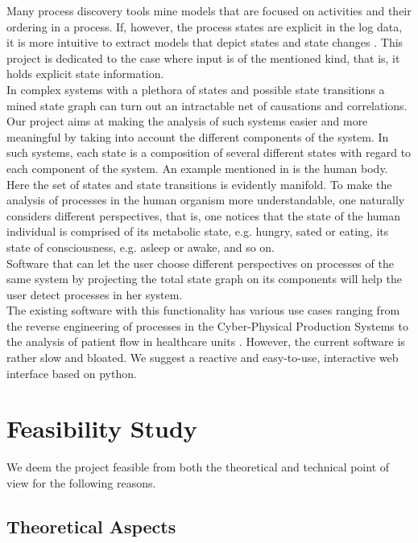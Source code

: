 \documentclass[12pt]{extarticle}
\begin{document}
Many process discovery tools mine models that are focused on activities and their ordering in a process. If, however, the process states are explicit in the log data, it is more intuitive to extract models that depict states and state changes \cite{csm-intro}. This project is dedicated to the case where input is of the mentioned kind, that is, it holds explicit state information.\\
In complex systems with a plethora of states and possible state transitions a mined state graph can turn out an intractable net of causations and correlations. Our project aims at making the analysis of such systems easier and more meaningful by taking into account the different components of the system. In such systems, each state is a composition of several different states with regard to each component of the system. An example mentioned in \cite{csm-intro} is the human body. Here the set of states and state transitions is evidently manifold. To make the analysis of processes in the human organism more understandable, one naturally considers different perspectives, that is, one notices that the state of the human individual is comprised of its metabolic state, e.g. hungry, sated or eating, its state of consciousness, e.g. asleep or awake, and so on.\\
Software that can let the user choose different perspectives on processes of the same system by projecting the total state graph on its components will help the user detect processes in her system.\\

The existing software \cite{prom} with this functionality has various use cases ranging from the reverse engineering of processes in the Cyber-Physical Production Systems\cite{cpps} to the analysis of patient flow in healthcare units \cite{patient}. However, the current software is rather slow and bloated. We suggest a reactive and easy-to-use, interactive web interface based on python.

\section{Feasibility Study}

We deem the project feasible from both the theoretical and technical point of view for the following reasons.

\subsection{Theoretical Aspects}
\end{document}
